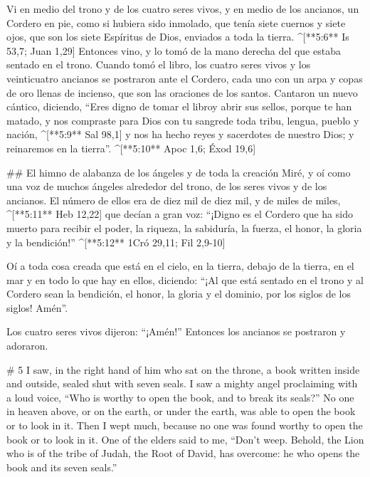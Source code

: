 \begin{paracols}{2}
 Vi en medio del trono y de los cuatro seres vivos, y en medio de los ancianos, un Cordero en pie, como si hubiera sido inmolado, que tenía siete cuernos y siete ojos, que son los siete Espíritus de Dios, enviados a toda la tierra. ^[**5:6** Is 53,7; Juan 1,29]  Entonces vino, y lo tomó de la mano derecha del que estaba sentado en el trono.  Cuando tomó el libro, los cuatro seres vivos y los veinticuatro ancianos se postraron ante el Cordero, cada uno con un arpa y copas de oro llenas de incienso, que son las oraciones de los santos.  Cantaron un nuevo cántico, diciendo, “Eres digno de tomar el libroy abrir sus sellos, porque te han matado, y nos compraste para Dios con tu sangrede toda tribu, lengua, pueblo y nación, ^[**5:9** Sal 98,1]  y nos ha hecho reyes y sacerdotes de nuestro Dios; y reinaremos en la tierra”. ^[**5:10** Apoc 1,6; Éxod 19,6]

## El himno de alabanza de los ángeles y de toda la creación
 Miré, y oí como una voz de muchos ángeles alrededor del trono, de los seres vivos y de los ancianos. El número de ellos era de diez mil de diez mil, y de miles de miles, ^[**5:11** Heb 12,22]  que decían a gran voz: “¡Digno es el Cordero que ha sido muerto para recibir el poder, la riqueza, la sabiduría, la fuerza, el honor, la gloria y la bendición!” ^[**5:12** 1Cró 29,11; Fil 2,9-10]

 Oí a toda cosa creada que está en el cielo, en la tierra, debajo de la tierra, en el mar y en todo lo que hay en ellos, diciendo: “¡Al que está sentado en el trono y al Cordero sean la bendición, el honor, la gloria y el dominio, por los siglos de los siglos! Amén”.

 Los cuatro seres vivos dijeron: “¡Amén!” Entonces los ancianos se postraron y adoraron.

\switchcolumn
\begin{english}

# 5
 I saw, in the right hand of him who sat on the throne, a book written inside and outside, sealed shut with seven seals.  I saw a mighty angel proclaiming with a loud voice, “Who is worthy to open the book, and to break its seals?”  No one in heaven above, or on the earth, or under the earth, was able to open the book or to look in it.  Then I wept much, because no one was found worthy to open the book or to look in it.  One of the elders said to me, “Don’t weep. Behold, the Lion who is of the tribe of Judah, the Root of David, has overcome: he who opens the book and its seven seals.” 


\end{english}
\end{paracols}
